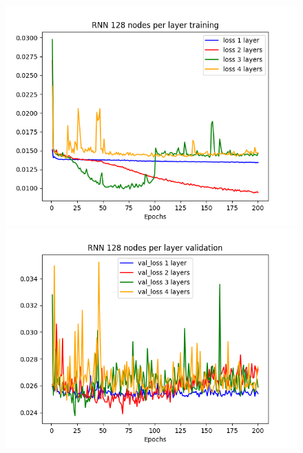 \documentclass[11pt]
{article}
\begin{document}
\begin{figure}[H]
\begin{minipage}[b]{0.33\linewidth}
		\includegraphics[width=\linewidth]{../TESTS_RESULTS/RNN_tests/plots/128_training.png} 
	\end{minipage}%
	\begin{minipage}[b]{0.33\linewidth}
		\centering
		\includegraphics[width=\linewidth]{../TESTS_RESULTS/RNN_tests/plots/128_validation.png} 
	\end{minipage} 
\hspace*{-2cm}  
	\begin{minipage}[b]{0.33\linewidth}
		\centering

\end{minipage}
\end{figure}
\end{document}

